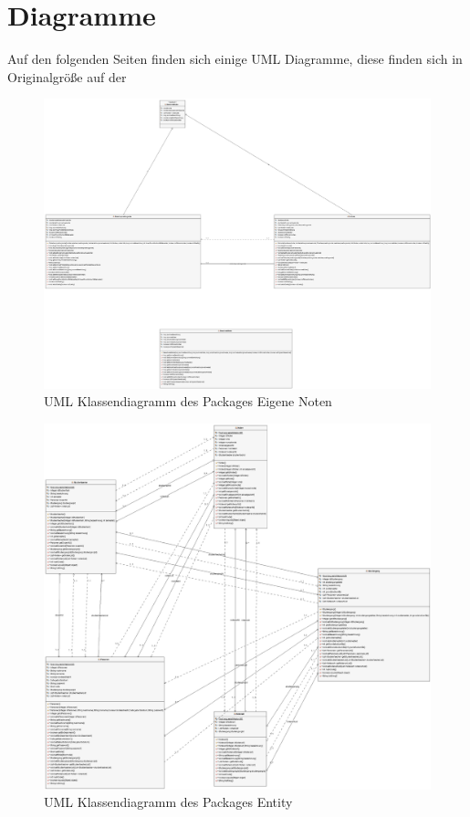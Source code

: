 \documentclass[12pt,a4paper,parskip]{scrreprt}
\begin{document}
\chapter{Diagramme}
Auf den folgenden Seiten finden sich einige UML Diagramme, diese finden sich in Originalgröße auf der 
\begin{figure}
	\centering
	\includegraphics[width=1\linewidth]{Diagramme/generated/package_eigene_noten_autosortiert}
	\caption[Package Eigene Noten]{UML Klassendiagramm des Packages \glqq Eigene Noten\grqq}
	\label{fig:package_eigene_noten}
\end{figure}
\begin{figure}
	\centering
	\includegraphics[width=1\linewidth]{Diagramme/generated/package_entity}
	\caption[Package Entity]{UML Klassendiagramm des Packages \glqq Entity\grqq}
	\label{fig:package_entity}
\end{figure}
\end{document}
